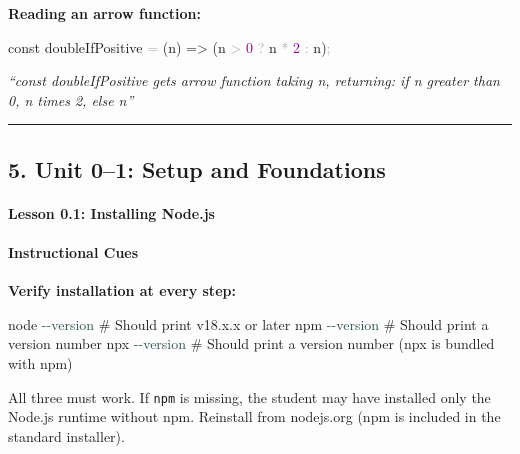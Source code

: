 \documentclass[
  justified,
  openright,
]{tufte-book}
\let\subsubsection\paragraph
\let\paragraph\paragraph
\newcommand{\AttributeTok}[1]{\textcolor{DarkSlateGray}{#1}}
\newcommand{\CommentTok}[1]{\textcolor{MidGray}{#1}}
\newcommand{\DecValTok}[1]{\textcolor{Purple}{#1}}
\newcommand{\ExtensionTok}[1]{#1}
\newcommand{\KeywordTok}[1]{\textcolor{BrandBlue}{#1}}
\newcommand{\NormalTok}[1]{#1}
\newcommand{\OperatorTok}[1]{\textcolor{DarkGray}{#1}}
\newenvironment{Shaded}{%
  \begin{snugshade}
}{%
  \end{snugshade}
}
\let\subsubsection\paragraph
\let\paragraph\paragraph
\begin{document}
\textbf{Reading an arrow function:}

\begin{Shaded}
\begin{Highlighting}[]
\KeywordTok{const}\NormalTok{ doubleIfPositive }\OperatorTok{=}\NormalTok{ (n) }\KeywordTok{=\textgreater{}}\NormalTok{ (n }\OperatorTok{\textgreater{}} \DecValTok{0} \OperatorTok{?}\NormalTok{ n }\OperatorTok{*} \DecValTok{2} \OperatorTok{:}\NormalTok{ n)}\OperatorTok{;}
\end{Highlighting}
\end{Shaded}

\emph{``const doubleIfPositive gets arrow function taking n, returning:
if n greater than 0, n times 2, else n''}

\begin{center}\rule{0.5\linewidth}{0.5pt}\end{center}

\subsection{5. Unit 0--1: Setup and
Foundations}\label{unit-01-setup-and-foundations}

\subsubsection{Lesson 0.1: Installing
Node.js}\label{lesson-0.1-installing-node.js}

\paragraph{Instructional Cues}\label{instructional-cues}

\textbf{Verify installation at every step:}

\begin{Shaded}
\begin{Highlighting}[]
\ExtensionTok{node} \AttributeTok{{-}{-}version}    \CommentTok{\# Should print v18.x.x or later}
\ExtensionTok{npm} \AttributeTok{{-}{-}version}     \CommentTok{\# Should print a version number}
\ExtensionTok{npx} \AttributeTok{{-}{-}version}     \CommentTok{\# Should print a version number (npx is bundled with npm)}
\end{Highlighting}
\end{Shaded}

All three must work. If \texttt{npm} is missing, the student may have
installed only the Node.js runtime without npm. Reinstall from
nodejs.org (npm is included in the standard installer).
\end{document}
